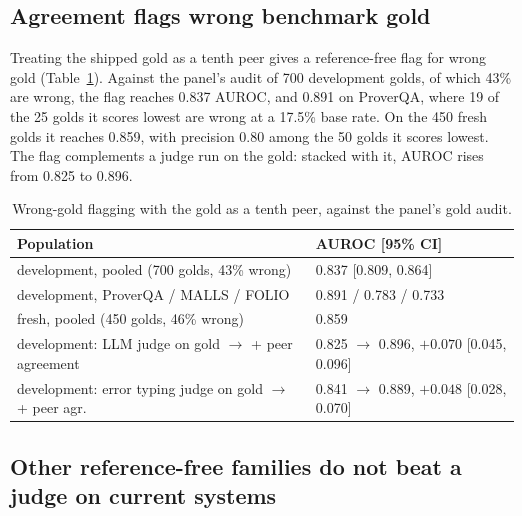 \documentclass[11pt,letterpaper]{article}
\begin{document}
\subsection{Agreement flags wrong benchmark gold}
\label{sec:gold}

Treating the shipped gold as a tenth peer gives a reference-free flag for wrong gold (Table~\ref{tab:gold}). Against the panel's audit of 700 development golds, of which 43\% are wrong, the flag reaches 0.837 AUROC, and 0.891 on ProverQA, where 19 of the 25 golds it scores lowest are wrong at a 17.5\% base rate. On the 450 fresh golds it reaches 0.859, with precision 0.80 among the 50 golds it scores lowest. The flag complements a judge run on the gold: stacked with it, AUROC rises from 0.825 to 0.896.

\begin{table}[!htbp]
  \centering
  \small
  \caption{Wrong-gold flagging with the gold as a tenth peer, against the panel's gold audit.}
  \label{tab:gold}
  \begin{tabular}{ll}
    \toprule
    Population & AUROC [95\% CI] \\
    \midrule
    development, pooled (700 golds, 43\% wrong) & 0.837 [0.809, 0.864] \\
    development, ProverQA / MALLS / FOLIO & 0.891 / 0.783 / 0.733 \\
    fresh, pooled (450 golds, 46\% wrong) & 0.859 \\
    development: LLM judge on gold $\rightarrow$ + peer agreement & 0.825 $\rightarrow$ 0.896, $+0.070$ [0.045, 0.096] \\
    development: error typing judge on gold $\rightarrow$ + peer agr. & 0.841 $\rightarrow$ 0.889, $+0.048$ [0.028, 0.070] \\
    \bottomrule
  \end{tabular}
\end{table}

\subsection{Other reference-free families do not beat a judge on current systems}
\label{sec:otherfamilies}
\end{document}
